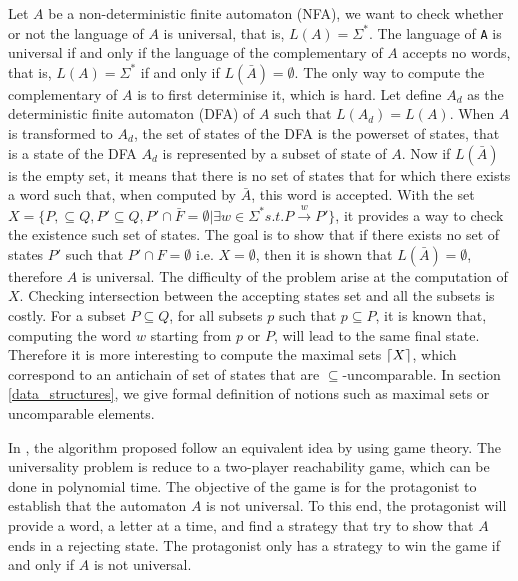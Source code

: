 \documentclass[letterpaper]{article}
\DeclarePairedDelimiter{\ceil}{\lceil}{\rceil}
\theoremstyle{definition}
\begin{document}
Let $A$ be a non-deterministic finite automaton (NFA),
we want to check whether or not
the language of $A$ is universal, that is, $L(A) = \Sigma^*$.
The language of \texttt{A} is universal if and only if the language
of the complementary of $A$ accepts no words, that is,
$L(A) = \Sigma^*$ if and only if $L(\bar{A}) = \emptyset$.
The only way to compute the complementary of $A$ is to first
determinise it, which is hard. Let define $A_d$ as the deterministic finite
automaton (DFA) of $A$ such that $L(A_d) = L(A)$.
When $A$ is transformed to $A_d$,
the set of states of the DFA is the powerset of states,
that is a state of the DFA $A_d$ is represented by a subset of state of $A$.
Now if $L(\bar{A})$ is the empty set,
it means that there is no set of states that for which there exists a word
such that, when computed by $\bar{A}$,
this word is accepted.
With the set
$X = \{ P,  \subseteq Q, P' \subseteq Q, P' \cap \bar{F} = \emptyset
| \exists w \in \Sigma^* s.t. P \xrightarrow{w} P'\}$, it provides
a way to check the existence such set of states.
The goal is to show that if there exists
no set of states $P'$ such that $P' \cap F = \emptyset$ i.e.
$X = \emptyset$, then it is shown that $L(\bar{A}) = \emptyset$, therefore
$A$ is universal. The difficulty of the problem arise at the computation
of $X$. Checking intersection between the accepting states set and all
the subsets is costly.
For a subset $P \subseteq Q$, for all subsets $p$ such that $p \subseteq P$,
it is known that, computing the word $w$ starting from $p$ or $P$, will lead
to the same final state. Therefore it is more interesting to compute
the maximal sets $\ceil{X}$, which correspond to an antichain of set of
states that are $\subseteq$-uncomparable. In section \ref{data_structures},
we give formal definition of notions such as maximal sets or uncomparable
elements.


In
\cite{AC_universality}, the algorithm proposed follow an equivalent
idea by using game theory. The universality problem is reduce to
a two-player reachability game, which can be done in polynomial time.
The objective of the game is for the protagonist to establish that
the automaton $A$ is not universal. To this end, the protagonist will
provide a word, a letter at a time, and find a strategy that try
to show that $A$ ends in a rejecting state.
The protagonist only has a strategy to win the game if and only if $A$ is
not universal.

\end{document}
